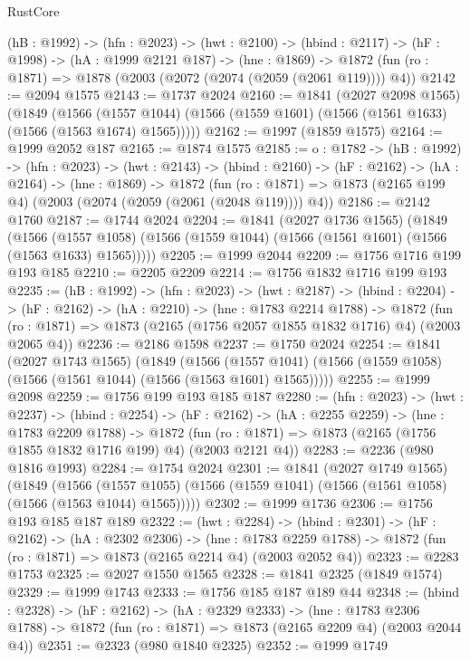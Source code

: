 \begin{lexlean}{RustCore}
\begin{coremodule}
  (hB : @1992) ->
  (hfn : @2023) ->
  (hwt : @2100) ->
  (hbind : @2117) ->
  (hF : @1998) ->
  (hA : @1999 @2121 @187) ->
  (hne : @1869) -> @1872 (fun (ro : @1871) => @1878 (@2003 (@2072 (@2074 (@2059 (@2061 @119)))) @4))
@2142 := @2094 @1575
@2143 := @1737 @2024
@2160 := @1841
    (@2027 @2098 @1565)
    (@1849
      (@1566 (@1557 @1044) (@1566 (@1559 @1601) (@1566 (@1561 @1633) (@1566 (@1563 @1674) @1565)))))
@2162 := @1997 (@1859 @1575)
@2164 := @1999 @2052 @187
@2165 := @1874 @1575
@2185 := {o : @1782} ->
  (hB : @1992) ->
  (hfn : @2023) ->
  (hwt : @2143) ->
  (hbind : @2160) ->
  (hF : @2162) ->
  (hA : @2164) ->
  (hne : @1869) ->
  @1872 (fun (ro : @1871) => @1873 (@2165 @199 @4) (@2003 (@2074 (@2059 (@2061 (@2048 @119)))) @4))
@2186 := @2142 @1760
@2187 := @1744 @2024
@2204 := @1841
    (@2027 @1736 @1565)
    (@1849
      (@1566 (@1557 @1058) (@1566 (@1559 @1044) (@1566 (@1561 @1601) (@1566 (@1563 @1633) @1565)))))
@2205 := @1999 @2044
@2209 := @1756 @1716 @199 @193 @185
@2210 := @2205 @2209
@2214 := @1756 @1832 @1716 @199 @193
@2235 := (hB : @1992) ->
  (hfn : @2023) ->
  (hwt : @2187) ->
  (hbind : @2204) ->
  (hF : @2162) ->
  (hA : @2210) ->
  (hne : @1783 @2214 @1788) ->
  @1872 (fun (ro : @1871) => @1873 (@2165 (@1756 @2057 @1855 @1832 @1716) @4) (@2003 @2065 @4))
@2236 := @2186 @1598
@2237 := @1750 @2024
@2254 := @1841
    (@2027 @1743 @1565)
    (@1849
      (@1566 (@1557 @1041) (@1566 (@1559 @1058) (@1566 (@1561 @1044) (@1566 (@1563 @1601) @1565)))))
@2255 := @1999 @2098
@2259 := @1756 @199 @193 @185 @187
@2280 := (hfn : @2023) ->
  (hwt : @2237) ->
  (hbind : @2254) ->
  (hF : @2162) ->
  (hA : @2255 @2259) ->
  (hne : @1783 @2209 @1788) ->
  @1872 (fun (ro : @1871) => @1873 (@2165 (@1756 @1855 @1832 @1716 @199) @4) (@2003 @2121 @4))
@2283 := @2236 (@980 @1816 @1993)
@2284 := @1754 @2024
@2301 := @1841
    (@2027 @1749 @1565)
    (@1849
      (@1566 (@1557 @1055) (@1566 (@1559 @1041) (@1566 (@1561 @1058) (@1566 (@1563 @1044) @1565)))))
@2302 := @1999 @1736
@2306 := @1756 @193 @185 @187 @189
@2322 := (hwt : @2284) ->
  (hbind : @2301) ->
  (hF : @2162) ->
  (hA : @2302 @2306) ->
  (hne : @1783 @2259 @1788) -> @1872 (fun (ro : @1871) => @1873 (@2165 @2214 @4) (@2003 @2052 @4))
@2323 := @2283 @1753
@2325 := @2027 @1550 @1565
@2328 := @1841 @2325 (@1849 @1574)
@2329 := @1999 @1743
@2333 := @1756 @185 @187 @189 @44
@2348 := (hbind : @2328) ->
  (hF : @2162) ->
  (hA : @2329 @2333) ->
  (hne : @1783 @2306 @1788) -> @1872 (fun (ro : @1871) => @1873 (@2165 @2209 @4) (@2003 @2044 @4))
@2351 := @2323 (@980 @1840 @2325)
@2352 := @1999 @1749

\end{coremodule}
\end{lexlean}
